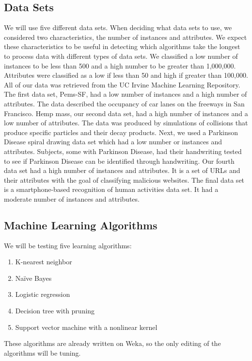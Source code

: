 \documentclass[11pt]{article} %
\begin{document}
\subsection{Data Sets}
We will use five different data sets.  When deciding what data sets to use, we considered two characteristics, the number of instances and attributes.  We expect these characteristics to be useful in detecting which algorithms take the longest to process data with different types of data sets.  We classified a low number of instances to be less than 500 and a high number to be greater than 1,000,000.  Attributes were classified as a low if less than 50 and high if greater than 100,000.  All of our data was retrieved from the UC Irvine Machine Learning Repository.  The first data set, Pems-SF, had a low number of instances and a high number of attributes.  The data described the occupancy of car lanes on the freeways in San Francisco.  Hemp mass, our second data set, had a high number of instances and a low number of attributes.  The data was produced by simulations of collisions that produce specific particles and their decay products. Next, we used a Parkinson Disease spiral drawing data set which had a low number or instances and attributes.  Subjects, some with Parkinson Disease, had their handwriting tested to see if Parkinson Disease can be identified through handwriting.  Our fourth data set had a high number of instances and attributes.  It is a set of URLs and their attributes with the goal of classifying malicious websites.  The final data set is a smartphone-based recognition of human activities data set.  It had a moderate number of instances and attributes.

\subsection{Machine Learning Algorithms}
We will be testing five learning algorithms:
\begin{enumerate}
	\item K-nearest neighbor
	\item Na\"{i}ve Bayes
	\item Logistic regression
	\item Decision tree with pruning
	\item Support vector machine with a nonlinear kernel
\end{enumerate}
These algorithms are already written on Weka, so the only editing of the algorithms will be tuning.
\end{document}
